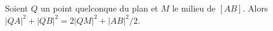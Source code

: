 Soient $Q$ un point quelconque du plan et $M$ le milieu de $[AB]$. Alors $|QA|^2 + |QB|^2 = 2|QM|^2 + |AB|^2/2$.
